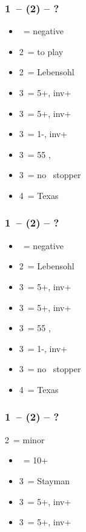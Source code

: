 \subsubsection*{1\ntx\ -- (2\hearts) -- ?}
\begin{itemize}
    \item \dbl\ = negative
    \item 2\spades\ = to play
    \item 2\nt\ = Lebensohl
    \item 3\clubs\ = 5+\diams, inv+
    \item 3\diams\ = 5+\spades, inv+
    \item 3\hearts\ = 1-\hearts, inv+
    \item 3\spades\ = 55 \minor, \gf
    \item 3\nt\ = no \hearts\ stopper
    \item 4\hearts\ = Texas
\end{itemize}

\subsubsection*{1\ntx\ -- (2\spades) -- ?}
\begin{itemize}
    \item \dbl\ = negative
    \item 2\nt\ = Lebensohl
    \item 3\clubs\ = 5+\diams, inv+
    \item 3\diams\ = 5+\hearts, inv+
    \item 3\hearts\ = 55 \minor, \gf
    \item 3\spades\ = 1-\spades, inv+
    \item 3\nt\ = no \spades\ stopper
    \item 4\diams\ = Texas
\end{itemize}

\subsubsection*{1\ntx\ -- (2\nt\alrts) -- ?}
2\nt\ = minor
\begin{itemize}
    \item \dbl\ = 10+
    \item 3\clubs\ = Stayman
    \item 3\diams\ = 5+\hearts, inv+
    \item 3\hearts\ = 5+\spades, inv+
\end{itemize}

